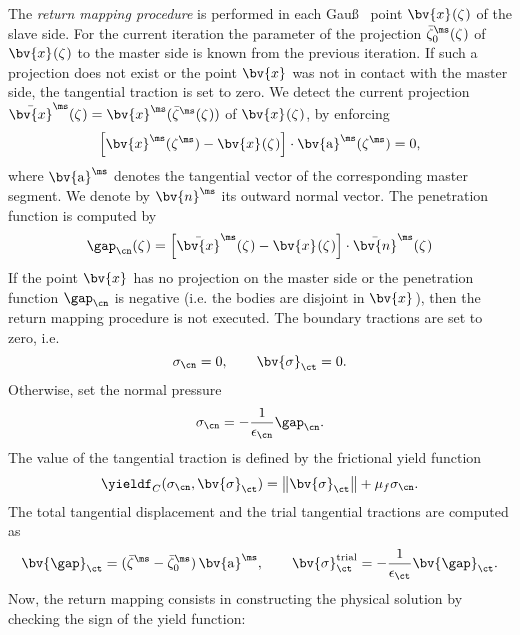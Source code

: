 The \textit{return mapping procedure} is performed in each Gau\ss ~ point $\bv{x}^{\sl}(\zeta^{\sl})$ of the slave side. For the current iteration the parameter of the projection $\bar{\zeta}^{\ms}_{0}(\zeta^{\sl})$ of $\bv{x}^{\sl}(\zeta^{\sl})$ to the master side is known from the previous iteration. If such a projection does not exist or the point $\bv{x}^{\sl}$ was not in contact with the master side, the tangential traction is set to zero. We detect the current projection $\bar{\bv{x}}^{\ms}(\zeta^{\sl})=\bv{x}^{\ms}(\bar{\zeta}^{\ms}(\zeta^{\sl}))$ of  $\bv{x}^{\sl}(\zeta^{\sl})$, by enforcing
\begin{equation*}
\left[ \bv{x}^{\ms}(\zeta^{\ms}) - \bv{x}^{\sl}(\zeta^{\sl}) \right]  \cdot \bv{\mathrm{a}}^{\ms}(\zeta^{\ms}) = 0,
\end{equation*}
where $\bv{\mathrm{a}}^{\ms}$ denotes the tangential vector of the corresponding master segment. We denote by $\bv{n}^{\ms}$ its outward normal vector. The penetration function is computed by
\begin{equation*}
\gap_{\cn}(\zeta^{\sl}) = \left[ \bar{\bv{x}}^{\ms}(\zeta^{\sl}) - \bv{x}^{\sl}(\zeta^{\sl}) \right] \cdot \bar{\bv{n}}^{\ms}(\zeta^{\sl})
\end{equation*}
If the point $\bv{x}^{\sl}$ has no projection on the master side or the penetration function $\gap_{\cn}$ is negative (i.e. the bodies are disjoint in $\bv{x}^{\sl}$), then the return mapping procedure is not executed. The boundary tractions are set to zero, i.e.
\begin{equation*}
\sigma_{\cn}=0, \qquad \bv{\sigma}_{\ct}=0.
\end{equation*}
Otherwise, set the normal pressure
\begin{equation*}
\sigma_{\cn} = - {\frac{1}{\epsilon_{\cn}}} \gap_{\cn}.
\end{equation*}
The value of the tangential traction is defined by the frictional yield function
\begin{equation*}
\yieldf_{C}(\sigma_{\cn},\bv{\sigma}_{\ct})=\left\| \bv{\sigma}_{\ct} \right\|+ \mu_f \sigma_{\cn}.
\end{equation*}
The total tangential displacement and the trial tangential tractions are computed as
\begin{equation*}
\bv{\gap}_{\ct} = (\bar{\zeta}^{\ms} - \bar{\zeta}^{\ms}_0) \, \bv{\mathrm{a}}^{\ms}, \qquad
\bv{\sigma}_{\ct}^{\text{trial}}= -{\frac{1}{\epsilon_{\ct}}} \bv{\gap}_{\ct}.
\end{equation*}
Now, the return mapping consists in constructing the physical solution by checking the sign of the yield function:
